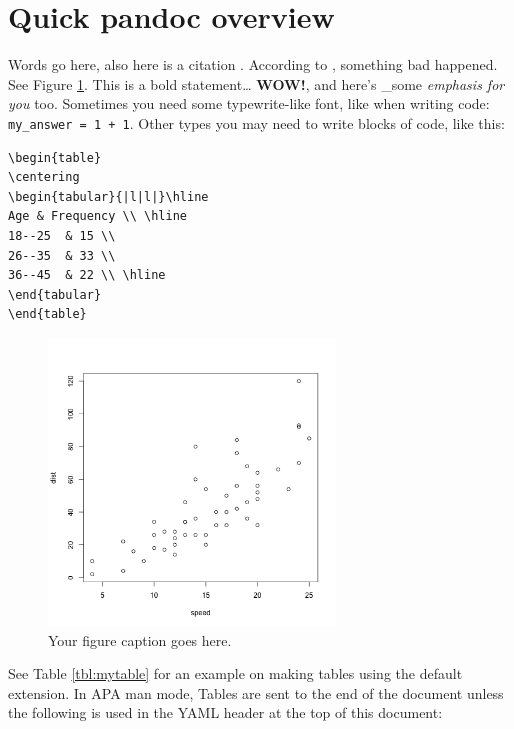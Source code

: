 \documentclass[doc,longtable]{apa6}
\begin{document}
\section{Quick pandoc overview}\label{quick-pandoc-overview}

Words go here, also here is a citation \autocite{someArticle}. According to \textcite{anotherArticle}, something bad happened. See Figure \ref{fig:myplot}. This is a bold statement\ldots{} \textbf{WOW!}, and here's \_some \emph{emphasis for you} too. Sometimes you need some typewrite-like font, like when writing code: \texttt{my\_answer\ =\ 1\ +\ 1}. Other types you may need to write blocks of code, like this:

\begin{verbatim}
\begin{table}
\centering
\begin{tabular}{|l|l|}\hline
Age & Frequency \\ \hline
18--25  & 15 \\
26--35  & 33 \\
36--45  & 22 \\ \hline
\end{tabular}
\end{table}
\end{verbatim}

\begin{figure}[htbp]
\centering
\includegraphics[width=3.00000in]{plot.png}
\caption{Your figure caption goes here.\label{fig:myplot}}
\end{figure}

See Table \ref{tbl:mytable} for an example on making tables using the default extension. In APA man mode, Tables are sent to the end of the document unless the following is used in the YAML header at the top of this document:
\end{document}
